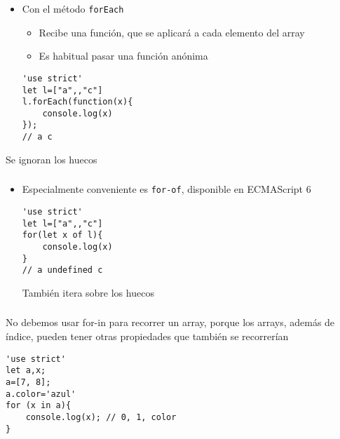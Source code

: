 \documentclass[ucs]{beamer}
\begin{document}
\begin{frame}[fragile]
\begin{itemize}

\item
Con el método 
\verb|forEach| 

    \begin{itemize}
    \item
Recibe una función, que se aplicará a cada elemento
del array

    \item
Es habitual pasar una función anónima
    \end{itemize}


  \begin{scriptsize}
  \begin{verbatim}
'use strict'
let l=["a",,"c"]
l.forEach(function(x){
    console.log(x)
});
// a c

  \end{verbatim}
  \end{scriptsize}

\end{itemize}

Se ignoran los huecos
\end{frame}



\begin{frame}[fragile]
\frametitle{}
\begin{itemize}
\item
Especialmente conveniente es \verb|for-of|, disponible en ECMAScript 6


  \begin{scriptsize}
  \begin{verbatim}
'use strict'
let l=["a",,"c"]
for(let x of l){
    console.log(x)
}
// a undefined c
  \end{verbatim}
  \end{scriptsize}


También itera sobre los huecos
\end{itemize}

\end{frame}


\begin{frame}[fragile]
\frametitle{}

No debemos usar for-in para recorrer un array, porque
los arrays, además de índice, pueden tener otras propiedades
que también se recorrerían


  \begin{scriptsize}
  \begin{verbatim}
'use strict'
let a,x;
a=[7, 8];
a.color='azul'
for (x in a){
    console.log(x); // 0, 1, color
}
  \end{verbatim}
  \end{scriptsize}

\end{frame}
\end{document}
